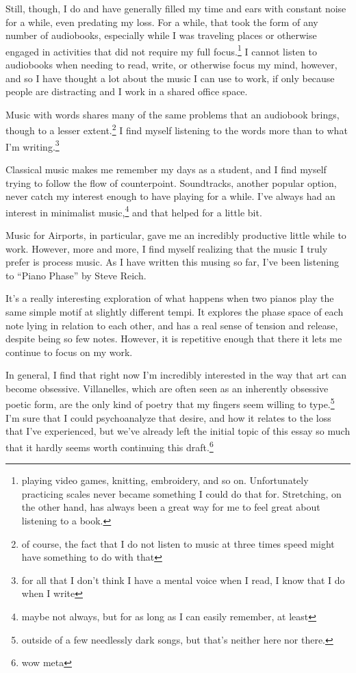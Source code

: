 \documentclass[12pt]{article}[titlepage]
\newcommand{\say}[1]{``#1''}
\newcommand{\1}{\={a}}
\newcommand{\2}{\={e}}
\newcommand{\3}{\={\i}}
\newcommand{\4}{\=o}
\newcommand{\5}{\=u}
\newcommand{\6}{\={A}}
\renewcommand{\,}{\textsuperscript{,}}
\begin{document}
Still, though, I do and have generally filled my time and ears with constant noise for a while, even predating my loss.  
For a while, that took the form of any number of audiobooks, especially while I was traveling places or otherwise engaged in activities that did not require my full focus.\footnote{playing video games, knitting, embroidery, and so on. Unfortunately practicing scales never became something I could do that for. Stretching, on the other hand, has always been a great way for me to feel great about listening to a book.}  
I cannot listen to audiobooks when needing to read, write, or otherwise focus my mind, however, and so I have thought a lot about the music I can use to work, if only because people are distracting and I work in a shared office space.

Music with words shares many of the same problems that an audiobook brings, though to a lesser extent.\footnote{of course, the fact that I do not listen to music at three times speed might have something to do with that}  
I find myself listening to the words more than to what I'm writing.\footnote{for all that I don't think I have a mental voice when I read, I know that I do when I write}

Classical music makes me remember my days as a student, and I find myself trying to follow the flow of counterpoint.  
Soundtracks, another popular option, never catch my interest enough to have playing for a while.  
I've always had an interest in minimalist music,\footnote{maybe not always, but for as long as I can easily remember, at least} and that helped for a little bit.

Music for Airports, in particular, gave me an incredibly productive little while to work.  
However, more and more, I find myself realizing that the music I truly prefer is process music.  
As I have written this musing so far, I've been listening to \say{Piano Phase} by Steve Reich.

It's a really interesting exploration of what happens when two pianos play the same simple motif at slightly different tempi.  
It explores the phase space of each note lying in relation to each other, and has a real sense of tension and release, despite being so few notes.  
However, it is repetitive enough that there it lets me continue to focus on my work.

In general, I find that right now I'm incredibly interested in the way that art can become obsessive.  
Villanelles, which are often seen as an inherently obsessive poetic form, are the only kind of poetry that my fingers seem willing to type.\footnote{outside of a few needlessly dark songs, but that's neither here nor there.}  
I'm sure that I could psychoanalyze that desire, and how it relates to the loss that I've experienced, but we've already left the initial topic of this essay so much that it hardly seems worth continuing this draft.\footnote{wow meta}  
\end{document}
